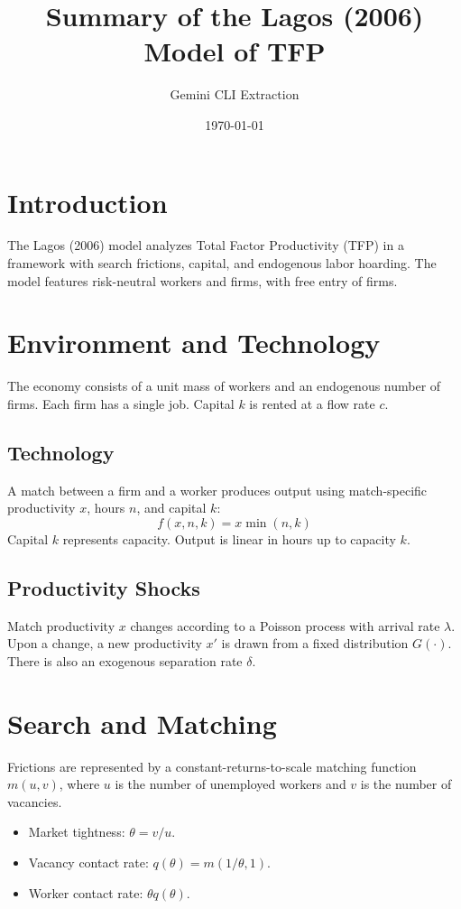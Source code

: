 \documentclass[11pt]{article}
\title{Summary of the Lagos (2006) Model of TFP}
\author{Gemini CLI Extraction}
\date{\today}
\begin{document}
\maketitle

\section{Introduction}
The Lagos (2006) model analyzes Total Factor Productivity (TFP) in a framework with search frictions, capital, and endogenous labor hoarding. The model features risk-neutral workers and firms, with free entry of firms.

\section{Environment and Technology}
The economy consists of a unit mass of workers and an endogenous number of firms. Each firm has a single job. Capital $k$ is rented at a flow rate $c$.

\subsection{Technology}
A match between a firm and a worker produces output using match-specific productivity $x$, hours $n$, and capital $k$:
\begin{equation}
f(x, n, k) = x \min(n, k)
\end{equation}
Capital $k$ represents capacity. Output is linear in hours up to capacity $k$.

\subsection{Productivity Shocks}
Match productivity $x$ changes according to a Poisson process with arrival rate $\lambda$. Upon a change, a new productivity $x'$ is drawn from a fixed distribution $G(\cdot)$. There is also an exogenous separation rate $\delta$.

\section{Search and Matching}
Frictions are represented by a constant-returns-to-scale matching function $m(u, v)$, where $u$ is the number of unemployed workers and $v$ is the number of vacancies.
\begin{itemize}
    \item Market tightness: $\theta = v/u$.
    \item Vacancy contact rate: $q(\theta) = m(1/\theta, 1)$.
    \item Worker contact rate: $\theta q(\theta)$.
\end{itemize}
\end{document}
